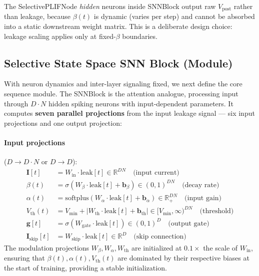 \documentclass{article}
\newcommand{\vpost}{V_{\text{post}}}
\newcommand{\vth}{V_{\text{th}}}
\newcommand{\vmin}{V_{\text{min}}}
\newcommand{\R}{\mathbb{R}}
\begin{document}
The SelectivePLIFNode \emph{hidden} neurons inside SNNBlock output raw $\vpost$ rather than leakage, because $\beta(t)$ is dynamic (varies per step) and cannot be absorbed into a static downstream weight matrix.
This is a deliberate design choice: leakage scaling applies only at fixed-$\beta$ boundaries.

\subsection{Selective State Space SNN Block (Module)}
\label{sec:snn-block}

With neuron dynamics and inter-layer signaling fixed, we next define the core sequence module. The SNNBlock is the attention analogue, processing input through $D \cdot N$ hidden spiking neurons with input-dependent parameters.
It computes \textbf{seven parallel projections} from the input leakage signal --- six input projections and one output projection:

\paragraph{Input projections} ($D \to D \cdot N$ or $D \to D$):
\begin{align}
    \mathbf{I}[t] &= W_{\text{in}} \cdot \text{leak}[t] \in \R^{DN} \quad \text{(input current)} \label{eq:block-I} \\
    \beta(t) &= \sigma(W_\beta \cdot \text{leak}[t] + \mathbf{b}_\beta) \in (0,1)^{DN} \quad \text{(decay rate)} \label{eq:block-beta} \\
    \alpha(t) &= \text{softplus}(W_\alpha \cdot \text{leak}[t] + \mathbf{b}_\alpha) \in \R_+^{DN} \quad \text{(input gain)} \label{eq:block-alpha} \\
    \vth(t) &= \vmin + |W_{\text{th}} \cdot \text{leak}[t] + \mathbf{b}_{\text{th}}| \in [\vmin, \infty)^{DN} \quad \text{(threshold)} \label{eq:block-vth} \\
    \mathbf{g}[t] &= \sigma(W_{\text{gate}} \cdot \text{leak}[t]) \in (0,1)^D \quad \text{(output gate)} \label{eq:block-gate} \\
    \mathbf{I}_{\text{skip}}[t] &= W_{\text{skip}} \cdot \text{leak}[t] \in \R^D \quad \text{(skip connection)} \label{eq:block-skip}
\end{align}
The modulation projections $W_\beta, W_\alpha, W_{\text{th}}$ are initialized at $0.1\times$ the scale of $W_{\text{in}}$, ensuring that $\beta(t), \alpha(t), \vth(t)$ are dominated by their respective biases at the start of training, providing a stable initialization.
\end{document}
